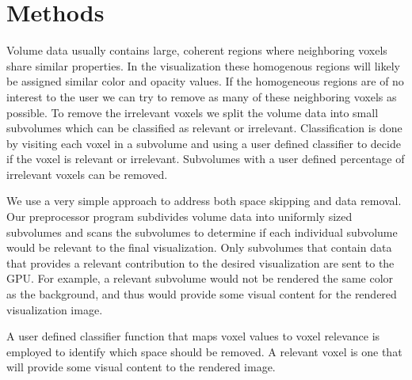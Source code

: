 \documentclass[journal]{vgtc}                %
\begin{document}
\section{Methods}\label{sec:methods}

Volume data usually contains large, coherent regions where neighboring voxels
share similar properties. In the visualization these homogenous regions will
likely be assigned similar color and opacity values. If the homogeneous regions
are of no interest to the user we can try to remove as many of these
neighboring voxels as possible.  To remove the irrelevant voxels we split the 
volume data into small subvolumes which can be classified as relevant or
irrelevant.  Classification is done by visiting each voxel in a subvolume and
using a user defined classifier to decide if the voxel is relevant or
irrelevant. Subvolumes with a user defined percentage of irrelevant voxels can
be removed.

We use a very simple approach to address both space skipping and 
data removal. Our preprocessor program subdivides volume data into uniformly
sized subvolumes and scans the subvolumes to determine if each individual subvolume
would be relevant to the final visualization. Only subvolumes that contain
data that provides a relevant contribution to the desired visualization are
sent to the GPU. For example, a relevant subvolume would not be rendered the
same color as the background, and thus would provide some visual content for the
rendered visualization image.

A user
defined classifier function that maps voxel values to voxel relevance is
employed to identify which space should be removed. A relevant voxel is one that
will provide some visual content to the rendered image.
\end{document}
